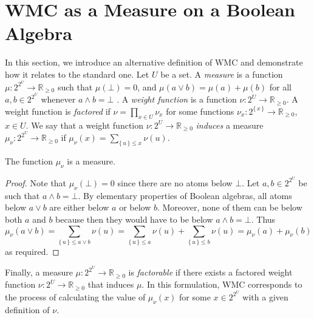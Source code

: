 \section{WMC as a Measure on a Boolean Algebra}\label{sec:wmc_as_measure}

In this section, we introduce an alternative definition of WMC and demonstrate
how it relates to the standard one. Let $U$ be a set. A \emph{measure} is a
function $\mu\colon 2^{2^U} \to \mathbb{R}_{\ge 0}$ such that $\mu(\bot) = 0$,
and $\mu(a \lor b) = \mu(a) + \mu(b)$ for all $a, b \in 2^{2^U}$ whenever
$a \land b = \bot$ \citep{gaifman1964concerning,DBLP:books/daglib/0090259}. A
\emph{weight function} is a function $\nu\colon 2^U \to \mathbb{R}_{\ge 0}$. A
weight function is \emph{factored} if $\nu = \prod_{x \in U} \nu_x$ for some
functions $\nu_x\colon 2^{\{\, x \,\}} \to \mathbb{R}_{\ge 0}$, $x \in U$. We
say that a weight function $\nu\colon 2^U \to \mathbb{R}_{\ge 0}$ \emph{induces}
a measure $\mu_\nu\colon 2^{2^U} \to \mathbb{R}_{\ge 0}$ if
$\mu_\nu(x) = \sum_{\{\, u \,\} \le x} \nu(u)$.

\begin{theorem}\label{prop:measure}
  The function $\mu_\nu$ is a measure.
\end{theorem}
\begin{proof}
  Note that $\mu_\nu(\bot) = 0$ since there are no atoms below $\bot$. Let
  $a, b \in 2^{2^{U}}$ be such that $a \land b = \bot$. By elementary properties
  of Boolean algebras, all atoms below $a \lor b$ are either below $a$ or below
  $b$. Moreover, none of them can be below both $a$ and $b$ because then they
  would have to be below $a \land b = \bot$. Thus
  \[
    \mu_\nu(a \lor b) = \sum_{\{\, u \,\} \le a \lor b} \nu(u) = \sum_{\{\, u \,\} \le a} \nu(u) + \sum_{\{\, u \,\} \le b} \nu(u) = \mu_\nu(a) + \mu_\nu(b)
  \]
  as required.
\end{proof}

Finally, a measure $\mu\colon 2^{2^U} \to \mathbb{R}_{\ge 0}$ is
\emph{factorable} if there exists a factored weight function
$\nu\colon 2^U \to \mathbb{R}_{\ge 0}$ that induces $\mu$. In this formulation,
WMC corresponds to the process of calculating the value of $\mu_\nu(x)$ for some
$x \in 2^{2^U}$ with a given definition of $\nu$.

